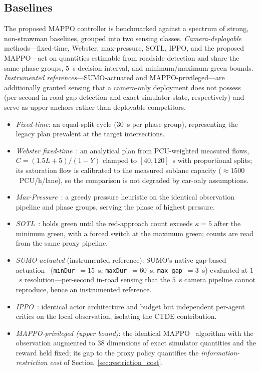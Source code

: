 \subsection{Baselines}
\label{sec:baselines}
The proposed MAPPO controller is benchmarked against a spectrum of strong, non-strawman
baselines, grouped into two sensing classes. \emph{Camera-deployable} methods---fixed-time,
Webster, max-pressure, SOTL, IPPO, and the proposed MAPPO---act on quantities estimable from
roadside detection and share the same phase groups, $5$~s decision interval, and
minimum/maximum-green bounds. \emph{Instrumented references}---SUMO-actuated and
MAPPO-privileged---are additionally granted sensing that a camera-only deployment does not
possess (per-second in-road gap detection and exact simulator state, respectively) and serve
as upper anchors rather than deployable competitors.
\begin{itemize}
  \item \emph{Fixed-time}: an equal-split cycle ($30$~s per phase group), representing the
        legacy plan prevalent at the target intersections.
  \item \emph{Webster fixed-time}~\cite{webster1958}: an analytical plan from PCU-weighted
        measured flows, $C = (1.5L + 5)/(1 - Y)$ clamped to $[40, 120]$~s with proportional
        splits; its saturation flow is calibrated to the measured sublane capacity
        ($\approx 1500$~PCU/h/lane), so the comparison is not degraded by car-only
        assumptions.
  \item \emph{Max-Pressure}~\cite{varaiya2013_maxpressure}: a greedy pressure heuristic on
        the identical observation pipeline and phase groups, serving the phase of highest
        pressure.
  \item \emph{SOTL}~\cite{cools2013_sotl}: holds green until the red-approach count exceeds
        $\kappa = 5$ after the minimum green, with a forced switch at the maximum green;
        counts are read from the same proxy pipeline.
  \item \emph{SUMO-actuated} (instrumented reference): SUMO's native gap-based
        actuation~\cite{lopez2018_sumo} (\texttt{minDur}~$=15$~s, \texttt{maxDur}~$=60$~s,
        \texttt{max-gap}~$=3$~s) evaluated at $1$~s resolution---per-second in-road sensing
        that the $5$~s camera pipeline cannot reproduce, hence an instrumented reference.
  \item \emph{IPPO}~\cite{dewitt2020_ippo}: identical actor architecture and budget but
        independent per-agent critics on the local observation, isolating the CTDE
        contribution.
  \item \emph{MAPPO-privileged (upper bound)}: the identical MAPPO~\cite{yu2022_mappo}
        algorithm with the observation augmented to $38$ dimensions of exact simulator
        quantities and the reward held fixed; its gap to the proxy policy quantifies the
        \emph{information-restriction cost} of Section~\ref{sec:restriction_cost}.
\end{itemize}

